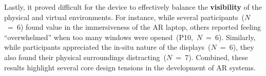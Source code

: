 Lastly, 
it proved difficult for the device to effectively balance the \textbf{visibility} of the physical and virtual environments.
For instance, while several participants~($N$~=~6) found value in the immersiveness of the AR laptop, others reported feeling ``overwhelmed'' when too many windows were opened~(P10,~$N$~=~6).
Similarly, while participants appreciated the in-situ nature of the displays~($N$~=~6), 
they also found their physical surroundings distracting~($N$~=~7). 
Combined, these results highlight several core design tensions in the development of AR systems.